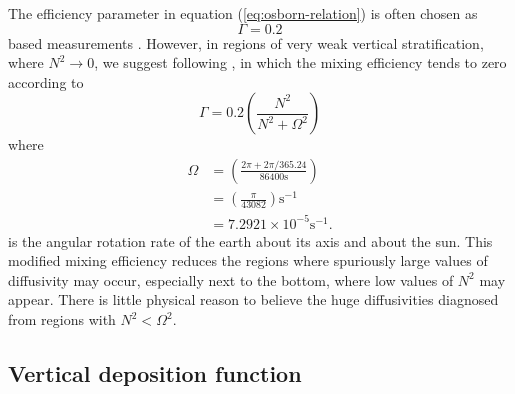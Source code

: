 The efficiency parameter in equation (\ref{eq:osborn-relation}) is
often chosen as
\begin{equation}
  \Gamma = 0.2
\end{equation}
based measurements \citep{Osborn1980,Ivey_Imberger1991}.  However, in
regions of very weak vertical stratification, where $N^{2} \rightarrow
0$, we suggest following \cite{Melet_etal_2013}, in which the mixing
efficiency tends to zero according to
\begin{equation}
  \Gamma = 0.2 \left( \frac{N^{2}}{N^{2} + \Omega^{2}} \right)
\label{eq:gamma-stratification-dependent}
\end{equation} 
 where 
\begin{equation}
\begin{split}
 \Omega &=  \left(\frac{2\pi + 2\pi/365.24}{86400 \mbox{s}} \right)
 \\
 &=
 \left( \frac{\pi}{43082} \right) \mbox{s}^{-1} 
 \\
 &=
 7.2921 \times 10^{-5} \mbox{s}^{-1}.
\end{split}
\label{eq:Omega-defined}
\end{equation}
is the angular rotation rate of the earth about its axis and about the
sun.  This modified mixing efficiency reduces the regions where
spuriously large values of diffusivity may occur, especially next to
the bottom, where low values of $N^{2}$ may appear.  There is little
physical reason to believe the huge diffusivities diagnosed from
regions with $N^{2} < \Omega^{2}$.


\subsection{Vertical deposition function}
\label{subsection:vertical-deposition}

